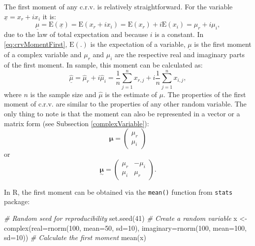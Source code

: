 \documentclass[
]{book}
\newenvironment{Shaded}{\begin{snugshade}}{\end{snugshade}}
\newcommand{\AttributeTok}[1]{\textcolor[rgb]{0.77,0.63,0.00}{#1}}
\newcommand{\CommentTok}[1]{\textcolor[rgb]{0.56,0.35,0.01}{\textit{#1}}}
\newcommand{\DecValTok}[1]{\textcolor[rgb]{0.00,0.00,0.81}{#1}}
\newcommand{\FunctionTok}[1]{\textcolor[rgb]{0.00,0.00,0.00}{#1}}
\newcommand{\NormalTok}[1]{#1}
\newcommand{\OtherTok}[1]{\textcolor[rgb]{0.56,0.35,0.01}{#1}}
\begin{document}
The first moment of any c.r.v. is relatively straightforward. For the variable \(\underline{x}=x_r+ix_i\) it is:
\begin{equation}
    \underline{\mu} = \mathrm{E}(\underline{x}) = \mathrm{E}(x_r + i x_i) = \mathrm{E}(x_r) + i \mathrm{E}(x_i) = \mu_{r} + i \mu_{i},
    \label{eq:crvMomentFirst}
\end{equation}
due to the law of total expectation and because \(i\) is a constant. In \eqref{eq:crvMomentFirst}, \(\mathrm{E}(.)\) is the expectation of a variable, \(\underline{\mu}\) is the first moment of a complex variable and \(\mu_{r}\) and \(\mu_{i}\) are the respective real and imaginary parts of the first moment. In sample, this moment can be calculated as:
\begin{equation}
    \underline{\hat{\mu}} = \hat{\mu}_{r} + i \hat{\mu}_{i} = \frac{1}{n}\sum_{j=1}^n x_{r,j} + i \frac{1}{n}\sum_{j=1}^n x_{i,j},
    \label{eq:crvMomentFirstSample}
\end{equation}
where \(n\) is the sample size and \(\hat{\mu}\) is the estimate of \(\mu\). The properties of the first moment of c.r.v. are similar to the properties of any other random variable. The only thing to note is that the moment can also be represented in a vector or a matrix form (see Subsection \ref{complexVariable}):
\begin{equation}
    \boldsymbol{\mu} = \begin{pmatrix} \mu_{r} \\ \mu_{i} \end{pmatrix} 
    \label{eq:crvMomentsVector}
\end{equation}
or
\begin{equation}
    \underset{\sim}{\boldsymbol{\mu}} = \begin{pmatrix} \mu_{r} & - \mu_{i} \\ \mu_{i} & \mu_{r} \end{pmatrix} .
    \label{eq:crvMomentsMatrix}
\end{equation}

In R, the first moment can be obtained via the \texttt{mean()} function from \texttt{stats} package:

\begin{Shaded}
\begin{Highlighting}[]
\CommentTok{\# Random seed for reproducibility}
\FunctionTok{set.seed}\NormalTok{(}\DecValTok{41}\NormalTok{)}
\CommentTok{\# Create a random variable}
\NormalTok{x }\OtherTok{\textless{}{-}} \FunctionTok{complex}\NormalTok{(}\AttributeTok{real=}\FunctionTok{rnorm}\NormalTok{(}\DecValTok{100}\NormalTok{, }\AttributeTok{mean=}\DecValTok{50}\NormalTok{, }\AttributeTok{sd=}\DecValTok{10}\NormalTok{),}
             \AttributeTok{imaginary=}\FunctionTok{rnorm}\NormalTok{(}\DecValTok{100}\NormalTok{, }\AttributeTok{mean=}\DecValTok{100}\NormalTok{, }\AttributeTok{sd=}\DecValTok{10}\NormalTok{))}
\CommentTok{\# Calculate the first moment}
\FunctionTok{mean}\NormalTok{(x)}
\end{Highlighting}
\end{Shaded}
\end{document}
